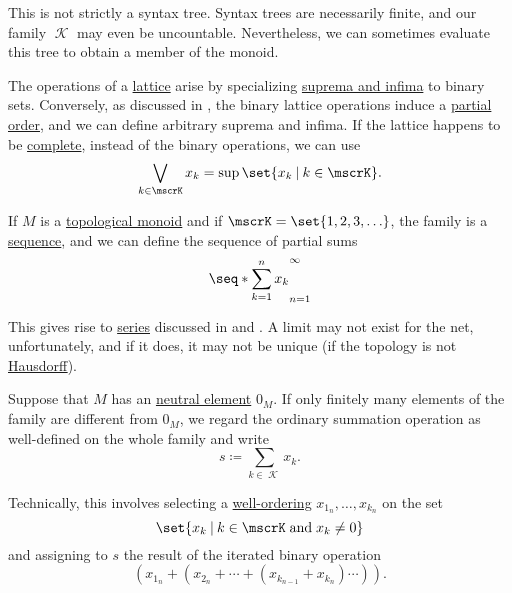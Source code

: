 \begin{remark}
\begin{thmenum}
    This is not strictly a syntax tree. Syntax trees are necessarily finite, and our family \( \mscrK \) may even be uncountable. Nevertheless, we can sometimes evaluate this tree to obtain a member of the monoid.
    \begin{thmenum}
       The operations of a \hyperref[def:lattice]{lattice} arise by specializing \hyperref[def:extremal_points/supremum_and_infimum]{suprema and infima} to binary sets. Conversely, as discussed in , the binary lattice operations induce a \hyperref[def:partially_ordered_set]{partial order}, and we can define arbitrary suprema and infima. If the lattice happens to be \hyperref[def:complete_lattice]{complete}, instead of the binary operations, we can use
      \begin{equation*}
        \bigvee_{k \in \mscrK} x_k = \sup\set{ x_k \given k \in \mscrK }.
      \end{equation*}

       If \( M \) is a \hyperref[rem:topological_first_order_structures]{topological monoid} and if \( \mscrK = \set{ 1, 2, 3, \ldots } \), the family is a \hyperref[def:sequence]{sequence}, and we can define the sequence of partial sums
      \begin{equation*}
        \seq*{ \sum_{k=1}^n x_k }_{n=1}^\infty
      \end{equation*}

      This gives rise to \hyperref[def:convergent_series]{series} discussed in  and . A limit may not exist for the net, unfortunately, and if it does, it may not be unique (if the topology is not \hyperref[def:separation_axioms/T2]{Hausdorff}).

       Suppose that \( M \) has an \hyperref[def:monoid]{neutral element} \( 0_M \). If only finitely many elements of the family are different from \( 0_M \), we regard the ordinary summation operation as well-defined on the whole family and write
      \begin{equation*}
        s \coloneqq \sum_{k \in \mscrK} x_k.
      \end{equation*}

      Technically, this involves selecting a \hyperref[def:well_ordered_set]{well-ordering} \( x_{1_n}, \ldots, x_{k_n} \) on the set
      \begin{equation*}
        \set{ x_k \given k \in \mscrK \T{and} x_k \neq 0 }
      \end{equation*}
      and assigning to \( s \) the result of the iterated binary operation
      \begin{equation*}
        (x_{1_n} + (x_{2_n} + \cdots + (x_{k_{n-1}} + x_{k_n}) \cdots)).
      \end{equation*}


\end{thmenum}
\end{thmenum}
\end{remark}
